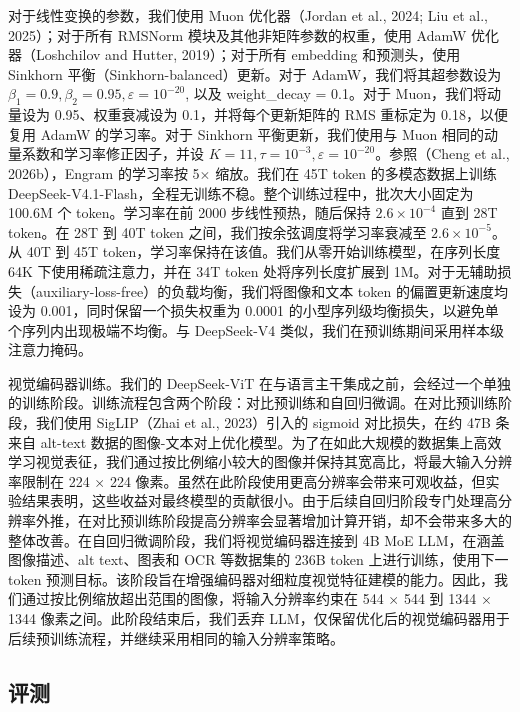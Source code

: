 \documentclass[
  10
]{article}
\begin{document}
对于线性变换的参数，我们使用 Muon 优化器（Jordan et al., 2024; Liu et al., 2025）；对于所有 RMSNorm 模块及其他非矩阵参数的权重，使用 AdamW 优化器（Loshchilov and Hutter, 2019）；对于所有 embedding 和预测头，使用 Sinkhorn 平衡（Sinkhorn-balanced）更新。对于 AdamW，我们将其超参数设为 \(\beta _ { 1 } = 0 . 9 , \beta _ { 2 } = 0 . 9 5 , \varepsilon = 1 0 ^ { - 2 0 }\), 以及 weight\_decay = 0.1。对于 Muon，我们将动量设为 0.95、权重衰减设为 0.1，并将每个更新矩阵的 RMS 重标定为 0.18，以便复用 AdamW 的学习率。对于 Sinkhorn 平衡更新，我们使用与 Muon 相同的动量系数和学习率修正因子，并设 \(K = 1 1 , \tau = 1 0 ^ { - 3 } , \varepsilon = 1 0 ^ { - 2 0 }\)。参照（Cheng et al., 2026b），Engram 的学习率按 5$\times$ 缩放。我们在 45T token 的多模态数据上训练 DeepSeek-V4.1-Flash，全程无训练不稳。整个训练过程中，批次大小固定为 100.6M 个 token。学习率在前 2000 步线性预热，随后保持 \(2 . 6 \times 1 0 ^ { - 4 }\) 直到 28T token。在 28T 到 40T token 之间，我们按余弦调度将学习率衰减至 \(2 . 6 \times 1 0 ^ { - 5 }\)。从 40T 到 45T token，学习率保持在该值。我们从零开始训练模型，在序列长度 64K 下使用稀疏注意力，并在 34T token 处将序列长度扩展到 1M。对于无辅助损失（auxiliary-loss-free）的负载均衡，我们将图像和文本 token 的偏置更新速度均设为 0.001，同时保留一个损失权重为 0.0001 的小型序列级均衡损失，以避免单个序列内出现极端不均衡。与 DeepSeek-V4 类似，我们在预训练期间采用样本级注意力掩码。

视觉编码器训练。我们的 DeepSeek-ViT 在与语言主干集成之前，会经过一个单独的训练阶段。训练流程包含两个阶段：对比预训练和自回归微调。在对比预训练阶段，我们使用 SigLIP（Zhai et al., 2023）引入的 sigmoid 对比损失，在约 47B 条来自 alt-text 数据的图像-文本对上优化模型。为了在如此大规模的数据集上高效学习视觉表征，我们通过按比例缩小较大的图像并保持其宽高比，将最大输入分辨率限制在 224 $\times$ 224 像素。虽然在此阶段使用更高分辨率会带来可观收益，但实验结果表明，这些收益对最终模型的贡献很小。由于后续自回归阶段专门处理高分辨率外推，在对比预训练阶段提高分辨率会显著增加计算开销，却不会带来多大的整体改善。在自回归微调阶段，我们将视觉编码器连接到 4B MoE LLM，在涵盖图像描述、alt text、图表和 OCR 等数据集的 236B token 上进行训练，使用下一 token 预测目标。该阶段旨在增强编码器对细粒度视觉特征建模的能力。因此，我们通过按比例缩放超出范围的图像，将输入分辨率约束在 544 $\times$ 544 到 1344 $\times$ 1344 像素之间。此阶段结束后，我们丢弃 LLM，仅保留优化后的视觉编码器用于后续预训练流程，并继续采用相同的输入分辨率策略。



\subsection{评测}\label{evaluations}
\end{document}
